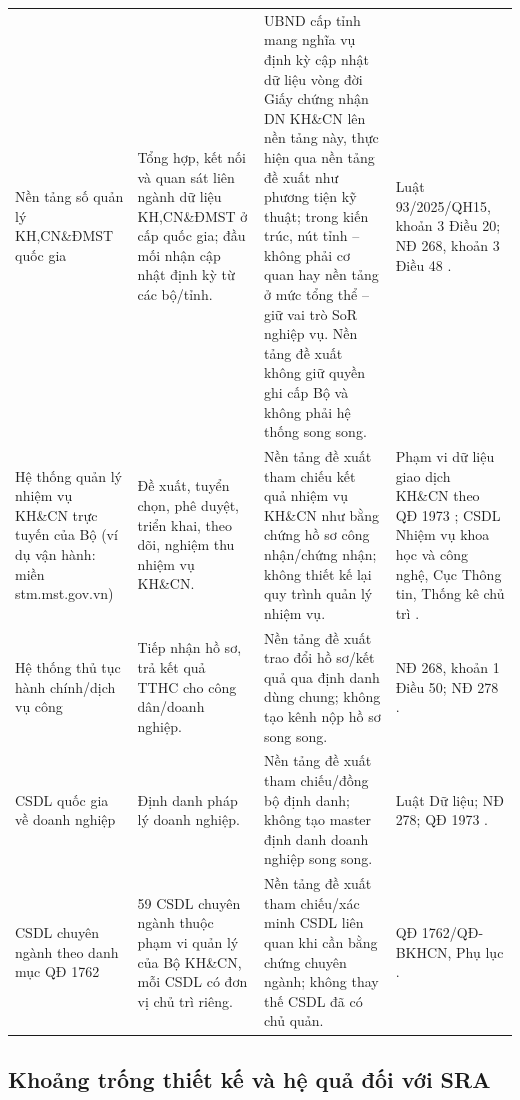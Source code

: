 {\begin{longtable}{@{}p{2.6cm}p{4.0cm}p{3.9cm}p{2.9cm}@{}}
Nền tảng số quản lý KH,CN\&ĐMST quốc gia & Tổng hợp, kết nối và quan sát liên ngành dữ liệu KH,CN\&ĐMST ở cấp quốc gia; đầu mối nhận cập nhật định kỳ từ các bộ/tỉnh. & UBND cấp tỉnh mang nghĩa vụ định kỳ cập nhật dữ liệu vòng đời Giấy chứng nhận DN KH\&CN lên nền tảng này, thực hiện qua nền tảng đề xuất như phương tiện kỹ thuật; trong kiến trúc, nút tỉnh -- không phải cơ quan hay nền tảng ở mức tổng thể -- giữ vai trò SoR nghiệp vụ. Nền tảng đề xuất không giữ quyền ghi cấp Bộ và không phải hệ thống song song. & Luật 93/2025/QH15, khoản 3 Điều 20; NĐ 268, khoản 3 Điều 48 \citep{luatkhcndmst2025,nd268_2025}. \\
\addlinespace
Hệ thống quản lý nhiệm vụ KH\&CN trực tuyến của Bộ (ví dụ vận hành: miền stm.mst.gov.vn) & Đề xuất, tuyển chọn, phê duyệt, triển khai, theo dõi, nghiệm thu nhiệm vụ KH\&CN. & Nền tảng đề xuất tham chiếu kết quả nhiệm vụ KH\&CN như bằng chứng hồ sơ công nhận/chứng nhận; không thiết kế lại quy trình quản lý nhiệm vụ. & Phạm vi dữ liệu giao dịch KH\&CN theo QĐ 1973 \citep{qd1973_2026}; CSDL Nhiệm vụ khoa học và công nghệ, Cục Thông tin, Thống kê chủ trì \citep[Phụ lục, STT 43]{qd1762_2025}. \\
\addlinespace
Hệ thống thủ tục hành chính/dịch vụ công & Tiếp nhận hồ sơ, trả kết quả TTHC cho công dân/doanh nghiệp. & Nền tảng đề xuất trao đổi hồ sơ/kết quả qua định danh dùng chung; không tạo kênh nộp hồ sơ song song. & NĐ 268, khoản 1 Điều 50; NĐ 278 \citep{nd268_2025,nd278_2025}. \\
\addlinespace
CSDL quốc gia về doanh nghiệp & Định danh pháp lý doanh nghiệp. & Nền tảng đề xuất tham chiếu/đồng bộ định danh; không tạo master định danh doanh nghiệp song song. & Luật Dữ liệu; NĐ 278; QĐ 1973 \citep{luatdulieu2024,nd278_2025,qd1973_2026}. \\
\addlinespace
CSDL chuyên ngành theo danh mục QĐ 1762 & 59 CSDL chuyên ngành thuộc phạm vi quản lý của Bộ KH\&CN, mỗi CSDL có đơn vị chủ trì riêng. & Nền tảng đề xuất tham chiếu/xác minh CSDL liên quan khi cần bằng chứng chuyên ngành; không thay thế CSDL đã có chủ quản. & QĐ 1762/QĐ-BKHCN, Phụ lục \citep{qd1762_2025}. \\
\end{longtable}
}

\subsection{Khoảng trống thiết kế và hệ quả đối với SRA}
\label{subsec:design-gap}

